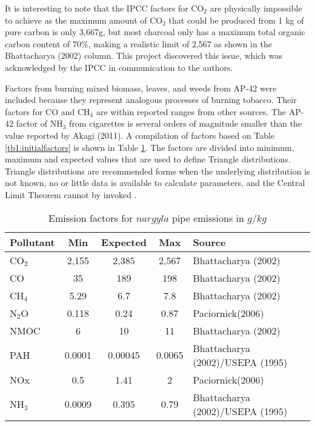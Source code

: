 It is interesting to note that the IPCC factors for CO$_{2}$ are physically impossible to achieve as the maximum amount of CO$_{2}$ that could be produced from 1 kg of pure carbon is only 3,667g, but most charcoal only has a maximum total organic carbon content of 70\%, making a realistic limit of 2,567 as shown in the Bhattacharya (2002) column.  This project discovered this issue, which was acknowledged by the IPCC in communication to the authors. 

Factors from burning mixed biomass, leaves, and weeds from AP-42 were included because they represent analogous processes of burning tobacco.  Their factors for CO and CH$_{4}$ are within reported ranges from other sources.  The AP-42 factor of NH$_{3}$ from cigarettes is several orders of magnitude smaller than the value reported by Akagi (2011). A compilation of factors based on Table \ref{tb1:initialfactors} is shown in Table \ref{tb2:emissionfactors}. The factors are divided into minimum, maximum and expected values that are used to define Triangle distributions. Triangle distributions are recommended forms when the underlying distribution is not known, no or little data is available to calculate parameters, and the Central Limit Theorem cannot by invoked \citep{Firestone1997, Lipton1995, Salling2008}. 

\begin{table}[]
\centering
\caption{Emission factors for $nargyla$ pipe emissions in $g/kg$}
\label{tb2:emissionfactors}
\begin{tabular}{@{}lcccl@{}}
\toprule
\textbf{Pollutant} & \textbf{Min} & \textbf{Expected} & \textbf{Max} & \textbf{Source} \\ \midrule
CO$_{2}$ & 2,155 & 2,385 & 2,567 & Bhattacharya (2002) \\
CO & 35 & 189 & 198 & Bhattacharya (2002) \\
CH$_{4}$ & 5.29 & 6.7 & 7.8 & Bhattacharya (2002) \\
N$_{2}$O & 0.118 & 0.24 & 0.87 & Paciornick(2006) \\
NMOC & 6 & 10 & 11 & Bhattacharya (2002) \\
PAH & 0.0001 & 0.00045 & 0.0065 & Bhattacharya (2002)/USEPA (1995) \\
NOx & 0.5 & 1.41 & 2 & Paciornick(2006) \\
NH$_{3}$ & 0.0009 & 0.395 & 0.79 & Bhattacharya (2002)/USEPA (1995) \\ \bottomrule
\end{tabular}
\end{table}


